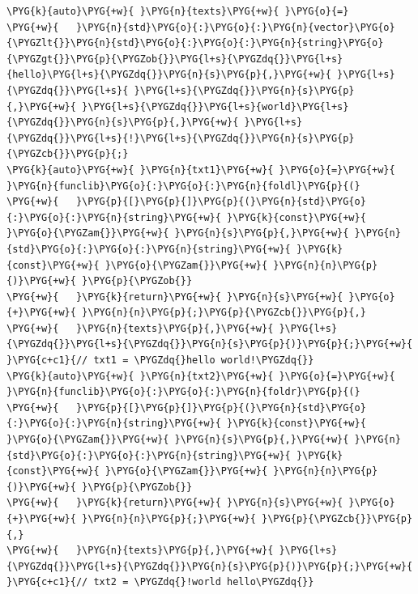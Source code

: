 \begin{itemize}
\begin{codeblockbg}
\begin{Verbatim}[commandchars=\\\{\},breaklines=true,breakanywhere=true,fontsize=\codefont,xleftmargin=17bp]
\PYG{k}{auto}\PYG{+w}{ }\PYG{n}{texts}\PYG{+w}{ }\PYG{o}{=}
\PYG{+w}{   }\PYG{n}{std}\PYG{o}{:}\PYG{o}{:}\PYG{n}{vector}\PYG{o}{\PYGZlt{}}\PYG{n}{std}\PYG{o}{:}\PYG{o}{:}\PYG{n}{string}\PYG{o}{\PYGZgt{}}\PYG{p}{\PYGZob{}}\PYG{l+s}{\PYGZdq{}}\PYG{l+s}{hello}\PYG{l+s}{\PYGZdq{}}\PYG{n}{s}\PYG{p}{,}\PYG{+w}{ }\PYG{l+s}{\PYGZdq{}}\PYG{l+s}{ }\PYG{l+s}{\PYGZdq{}}\PYG{n}{s}\PYG{p}{,}\PYG{+w}{ }\PYG{l+s}{\PYGZdq{}}\PYG{l+s}{world}\PYG{l+s}{\PYGZdq{}}\PYG{n}{s}\PYG{p}{,}\PYG{+w}{ }\PYG{l+s}{\PYGZdq{}}\PYG{l+s}{!}\PYG{l+s}{\PYGZdq{}}\PYG{n}{s}\PYG{p}{\PYGZcb{}}\PYG{p}{;}
\PYG{k}{auto}\PYG{+w}{ }\PYG{n}{txt1}\PYG{+w}{ }\PYG{o}{=}\PYG{+w}{ }\PYG{n}{funclib}\PYG{o}{:}\PYG{o}{:}\PYG{n}{foldl}\PYG{p}{(}
\PYG{+w}{   }\PYG{p}{[}\PYG{p}{]}\PYG{p}{(}\PYG{n}{std}\PYG{o}{:}\PYG{o}{:}\PYG{n}{string}\PYG{+w}{ }\PYG{k}{const}\PYG{+w}{ }\PYG{o}{\PYGZam{}}\PYG{+w}{ }\PYG{n}{s}\PYG{p}{,}\PYG{+w}{ }\PYG{n}{std}\PYG{o}{:}\PYG{o}{:}\PYG{n}{string}\PYG{+w}{ }\PYG{k}{const}\PYG{+w}{ }\PYG{o}{\PYGZam{}}\PYG{+w}{ }\PYG{n}{n}\PYG{p}{)}\PYG{+w}{ }\PYG{p}{\PYGZob{}}
\PYG{+w}{   }\PYG{k}{return}\PYG{+w}{ }\PYG{n}{s}\PYG{+w}{ }\PYG{o}{+}\PYG{+w}{ }\PYG{n}{n}\PYG{p}{;}\PYG{p}{\PYGZcb{}}\PYG{p}{,}
\PYG{+w}{   }\PYG{n}{texts}\PYG{p}{,}\PYG{+w}{ }\PYG{l+s}{\PYGZdq{}}\PYG{l+s}{\PYGZdq{}}\PYG{n}{s}\PYG{p}{)}\PYG{p}{;}\PYG{+w}{    }\PYG{c+c1}{// txt1 = \PYGZdq{}hello world!\PYGZdq{}}
\PYG{k}{auto}\PYG{+w}{ }\PYG{n}{txt2}\PYG{+w}{ }\PYG{o}{=}\PYG{+w}{ }\PYG{n}{funclib}\PYG{o}{:}\PYG{o}{:}\PYG{n}{foldr}\PYG{p}{(}
\PYG{+w}{   }\PYG{p}{[}\PYG{p}{]}\PYG{p}{(}\PYG{n}{std}\PYG{o}{:}\PYG{o}{:}\PYG{n}{string}\PYG{+w}{ }\PYG{k}{const}\PYG{+w}{ }\PYG{o}{\PYGZam{}}\PYG{+w}{ }\PYG{n}{s}\PYG{p}{,}\PYG{+w}{ }\PYG{n}{std}\PYG{o}{:}\PYG{o}{:}\PYG{n}{string}\PYG{+w}{ }\PYG{k}{const}\PYG{+w}{ }\PYG{o}{\PYGZam{}}\PYG{+w}{ }\PYG{n}{n}\PYG{p}{)}\PYG{+w}{ }\PYG{p}{\PYGZob{}}
\PYG{+w}{   }\PYG{k}{return}\PYG{+w}{ }\PYG{n}{s}\PYG{+w}{ }\PYG{o}{+}\PYG{+w}{ }\PYG{n}{n}\PYG{p}{;}\PYG{+w}{ }\PYG{p}{\PYGZcb{}}\PYG{p}{,}
\PYG{+w}{   }\PYG{n}{texts}\PYG{p}{,}\PYG{+w}{ }\PYG{l+s}{\PYGZdq{}}\PYG{l+s}{\PYGZdq{}}\PYG{n}{s}\PYG{p}{)}\PYG{p}{;}\PYG{+w}{    }\PYG{c+c1}{// txt2 = \PYGZdq{}!world hello\PYGZdq{}}
\end{Verbatim}
\end{codeblockbg}




\end{itemize}
